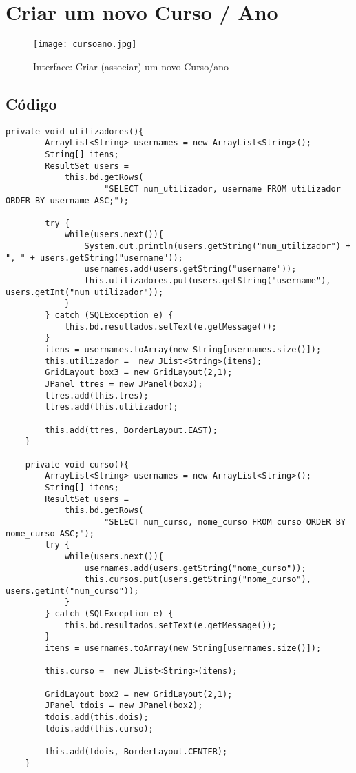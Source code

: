 \section{Criar um novo Curso / Ano}

\begin{figure}[!htbp]
\centering
\texttt{[image: cursoano.jpg]}
\caption{Interface: Criar (associar) um novo Curso/ano}
\label{fig:curso1}
\end{figure}

\subsection{Código}
\begin{lstlisting}
private void utilizadores(){
		ArrayList<String> usernames = new ArrayList<String>();
		String[] itens;
		ResultSet users = 
			this.bd.getRows(
					"SELECT num_utilizador, username FROM utilizador ORDER BY username ASC;");
		
		try {
			while(users.next()){
				System.out.println(users.getString("num_utilizador") + ", " + users.getString("username"));
				usernames.add(users.getString("username"));
				this.utilizadores.put(users.getString("username"), users.getInt("num_utilizador"));
			}
		} catch (SQLException e) {
			this.bd.resultados.setText(e.getMessage());
		}
		itens = usernames.toArray(new String[usernames.size()]);
		this.utilizador =  new JList<String>(itens);
		GridLayout box3 = new GridLayout(2,1);
		JPanel ttres = new JPanel(box3);
		ttres.add(this.tres);
		ttres.add(this.utilizador);
		
		this.add(ttres, BorderLayout.EAST);
	}
	
	private void curso(){
		ArrayList<String> usernames = new ArrayList<String>();
		String[] itens;
		ResultSet users = 
			this.bd.getRows(
					"SELECT num_curso, nome_curso FROM curso ORDER BY nome_curso ASC;");
		try {
			while(users.next()){
				usernames.add(users.getString("nome_curso"));
				this.cursos.put(users.getString("nome_curso"), users.getInt("num_curso"));
			}
		} catch (SQLException e) {
			this.bd.resultados.setText(e.getMessage());
		}
		itens = usernames.toArray(new String[usernames.size()]);
		
		this.curso =  new JList<String>(itens);
		
		GridLayout box2 = new GridLayout(2,1);
		JPanel tdois = new JPanel(box2);
		tdois.add(this.dois);
		tdois.add(this.curso);
		
		this.add(tdois, BorderLayout.CENTER);
	}
	

\end{lstlisting}
